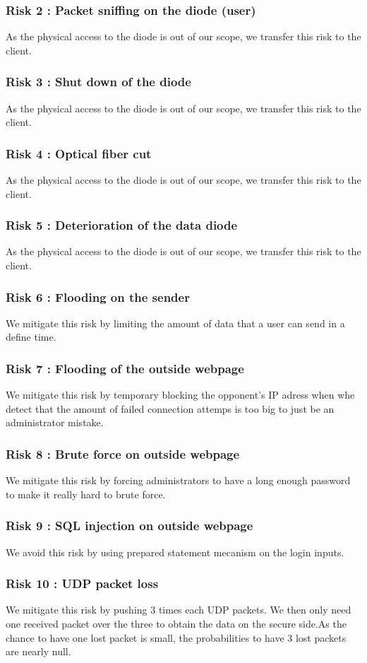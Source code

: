\documentclass[a4paper,11pt]{article}
\begin{document}
\subsubsection{Risk 2 : Packet sniffing on the diode (user) }
As the physical access to the diode is out of our scope, we transfer this risk to the client.
\subsubsection{Risk 3 : Shut down of the diode}
As the physical access to the diode is out of our scope, we transfer this risk to the client.
\subsubsection{Risk 4 : Optical fiber cut}
As the physical access to the diode is out of our scope, we transfer this risk to the client.
\subsubsection{Risk 5 : Deterioration of the data diode}
As the physical access to the diode is out of our scope, we transfer this risk to the client.
\subsubsection{Risk 6 : Flooding on the sender}
We mitigate this risk by limiting the amount of data that a user can send in a define time.
\subsubsection{Risk 7 : Flooding of the outside webpage}
We mitigate this risk by temporary blocking the opponent's IP adress when whe detect that the amount of failed connection attemps is too big to just be an administrator mistake.
\subsubsection{Risk 8 : Brute force on outside webpage}
We mitigate this risk by forcing administrators to have a long enough password to make it really hard to brute force.
\subsubsection{Risk 9 : SQL injection on outside webpage}
We avoid this risk by using prepared statement mecanism on the login inputs.
\subsubsection{Risk 10 : UDP packet loss}
We mitigate this risk by pushing 3 times each UDP packets. We then only need one received packet over the three to obtain the data on the secure side.As the chance to have one lost packet is small, the probabilities to have 3 lost packets are nearly null.
\end{document}
